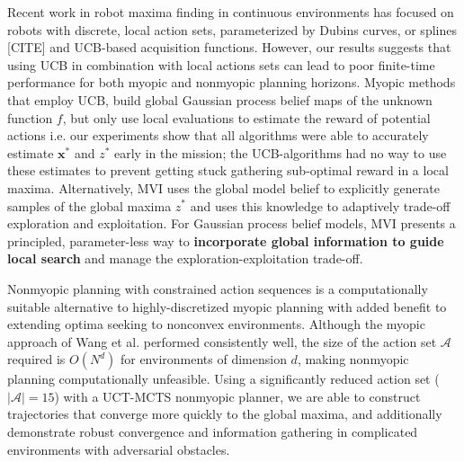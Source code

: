 \documentclass{styles/svproc}
\newcommand{\x}{\mathbf{x}}
\begin{document}
Recent work in robot maxima finding in continuous environments has focused on robots with discrete, local action sets, parameterized by Dubins curves, or splines [CITE] and UCB-based acquisition functions. However, our results suggests that using UCB in combination with local actions sets can lead to poor finite-time performance for both myopic and nonmyopic planning horizons. Myopic methods that employ UCB, build global Gaussian process belief maps of the unknown function $f$, but only use local evaluations to estimate the reward of potential actions i.e. our experiments show that all algorithms were able to accurately estimate $\x^*$ and $z^*$ early in the mission; the UCB-algorithms had no way to use these estimates to prevent getting stuck gathering sub-optimal reward in a local maxima.  Alternatively, MVI uses the global model belief to explicitly generate samples of the global maxima $z^*$ and uses this knowledge to adaptively trade-off exploration and exploitation. %
For Gaussian process belief models, MVI presents a principled, parameter-less way to \textbf{incorporate global information to guide local search} and manage the exploration-exploitation trade-off. 

Nonmyopic planning with constrained action sequences is a computationally suitable alternative to highly-discretized myopic planning with added benefit to extending optima seeking to nonconvex environments. Although the myopic approach of Wang et al. \cite{wang2017max} performed consistently well, the size of the action set $\mathcal{A}$ required is $O(N^d)$ for environments of dimension $d$, making nonmyopic planning computationally unfeasible.  Using a significantly reduced action set ($\left\vert \mathcal{A} \right\vert = 15$) with a UCT-MCTS nonmyopic planner, we are able to construct trajectories that converge more quickly to the global maxima, and additionally demonstrate robust convergence and information gathering in complicated environments with adversarial obstacles. 
\end{document}
